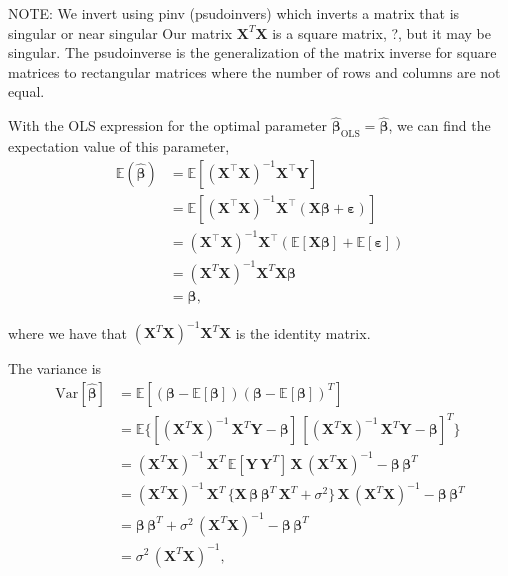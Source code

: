 \documentclass[reprint,english,notitlepage]{revtex4-1}  %
\begin{document}
NOTE: We invert using pinv (psudoinvers) which inverts a matrix that is singular or near singular 
Our matrix $\mathbf{X}^T\mathbf{X}$ is a square matrix, ?, but it may be singular. The psudoinverse is the generalization of the matrix inverse for square matrices to rectangular matrices where the number of rows and columns are not equal. 


With the OLS expression for the optimal parameter $\boldsymbol{\hat{\beta}}_\text{OLS} = \boldsymbol{\hat{\beta}}$, we can find the expectation value of this parameter, 
\begin{align}
    \mathbb{E}(\boldsymbol{\hat{\beta}}) 
    &= \mathbb{E}[(\mathbf{X}^{\top} \mathbf{X})^{-1}\mathbf{X}^{\top} \mathbf{Y}] \nonumber \\ 
    &= \mathbb{E}[(\mathbf{X}^{\top} \mathbf{X})^{-1}\mathbf{X}^{\top} (\mathbf{X}\boldsymbol{\beta} + \boldsymbol{\varepsilon})] \nonumber \\ 
    &= (\mathbf{X}^{\top} \mathbf{X})^{-1}\mathbf{X}^{\top} (\mathbb{E}[\mathbf{X}\boldsymbol{\beta}] + \mathbb{E}[\boldsymbol{\varepsilon}]) \nonumber \\ 
    &= (\mathbf{X}^{T} \mathbf{X})^{-1} \mathbf{X}^{T}\mathbf{X}\boldsymbol{\beta} \nonumber \\ 
    &=\boldsymbol{\beta}, \nonumber
\end{align}

where we have that $(\mathbf{X}^{T} \mathbf{X})^{-1} \mathbf{X}^{T}\mathbf{X}$ is the identity matrix. 

The variance is 
\begin{align}
    \text{Var}[\boldsymbol{\hat{\beta}}] 
    & = \mathbb{E} [ (\boldsymbol{\beta} 
        - \mathbb{E}[\boldsymbol{\beta}]) (\boldsymbol{\beta} 
        - \mathbb{E}[\boldsymbol{\beta}])^{T} ] \nonumber \\
    & = \mathbb{E} \{ [(\mathbf{X}^{T} \mathbf{X})^{-1} \, \mathbf{X}^{T} \mathbf{Y} 
        - \boldsymbol{\beta}] \, [(\mathbf{X}^{T} \mathbf{X})^{-1} \, \mathbf{X}^{T} \mathbf{Y} 
        - \boldsymbol{\beta}]^{T} \} \nonumber \\
    & = (\mathbf{X}^{T} \mathbf{X})^{-1} \, \mathbf{X}^{T} \, \mathbb{E} [\mathbf{Y} \, \mathbf{Y}^{T}] \, \mathbf{X} \, (\mathbf{X}^{T} \mathbf{X})^{-1} 
        - \boldsymbol{\beta} \, \boldsymbol{\beta}^{T} \nonumber \\
    & = (\mathbf{X}^{T} \mathbf{X})^{-1} \, \mathbf{X}^{T} \, \{ \mathbf{X} \, \boldsymbol{\beta} \, \boldsymbol{\beta}^{T} \,  \mathbf{X}^{T} 
        + \sigma^2 \} \, \mathbf{X} \, (\mathbf{X}^{T} \mathbf{X})^{-1} - \boldsymbol{\beta} \, \boldsymbol{\beta}^{T} \nonumber \\ 
    & = \boldsymbol{\beta} \, \boldsymbol{\beta}^{T} 
        + \sigma^2 \, (\mathbf{X}^{T} \mathbf{X})^{-1} 
        - \boldsymbol{\beta} \, \boldsymbol{\beta}^{T} \nonumber \\ 
    & = \sigma^2 \, (\mathbf{X}^{T} \mathbf{X})^{-1}, \nonumber 
\end{align}
\end{document}
